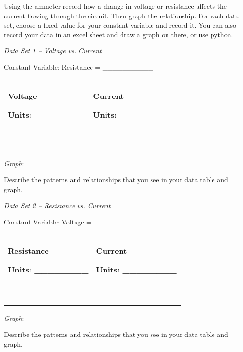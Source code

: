 \documentclass[11pt]{article}
\begin{document}
Using the ammeter record how a change in voltage or resistance affects
the current flowing through the circuit. Then graph the relationship.
For each data set, choose a fixed value for your constant variable and
record it. You can also record your data in an excel sheet and draw a
graph on there, or use python.

\emph{Data Set 1 -- Voltage vs. Current}

Constant Variable: Resistance = \_\_\_\_\_\_\_\_\_\_

\begin{longtable}[]{@{}ll@{}}
\toprule
\textbf{Voltage}

Units:\_\_\_\_\_\_\_\_ & \textbf{Current}

Units:\_\_\_\_\_\_\_\_\tabularnewline
\midrule
\endhead
&\tabularnewline
&\tabularnewline
&\tabularnewline
&\tabularnewline
&\tabularnewline
&\tabularnewline
&\tabularnewline
\bottomrule
\end{longtable}

\emph{Graph}:

Describe the patterns and relationships that you see in your data table
and graph.

\emph{Data Set 2 -- Resistance vs. Current}

Constant Variable: Voltage = \_\_\_\_\_\_\_\_\_\_

\begin{longtable}[]{@{}ll@{}}
\toprule
\textbf{Resistance}

Units: \_\_\_\_\_\_\_\_ & \textbf{Current}

Units: \_\_\_\_\_\_\_\_\tabularnewline
\midrule
\endhead
&\tabularnewline
&\tabularnewline
&\tabularnewline
&\tabularnewline
&\tabularnewline
&\tabularnewline
&\tabularnewline
\bottomrule
\end{longtable}

\emph{Graph}:

Describe the patterns and relationships that you see in your data table
and graph.
\end{document}
